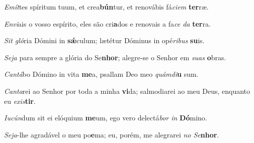 \begin{greenumerate}
  \setcounter{enumi}{1}


  \item \textit{Emít}tes spíritum tuum, et crea\textbf{bún}tur, {\GreStar} et renovábis fá\textit{ciem} \textbf{ter}ræ. 

  \switchcolumn\setcounter{enumi}{1}

  \item \textit{Envi}ais o vosso espírito, eles são cri\textbf{a}dos {\GreStar} e renovais a fa\textit{ce da} \textbf{ter}ra. 

  \switchcolumn*


  \item \textit{Sit gló}ria Dómini in \textbf{sǽ}culum; {\GreStar} lætétur Dóminus in opé\textit{ribus} \textbf{su}is. 

  \switchcolumn%

  \item \textit{Seja} para sempre a glória do Se\textbf{nhor}; {\GreStar} alegre-se o Senhor em \textit{suas} \textbf{o}bras. 

  \switchcolumn*


  \item \textit{Cantá}bo Dómino in vita \textbf{me}a, {\GreStar} psallam Deo meo \textit{quámdi}\textbf{u} sum. 

  \switchcolumn%

  \item \textit{Canta}rei ao Senhor por toda a minha \textbf{vi}da; {\GreStar} salmodiarei ao meu Deus, enquanto eu \textit{exis}\textbf{tir}. 

  \switchcolumn*


  \item \textit{Iucún}dum sit ei elóquium \textbf{me}um, {\GreStar} ego vero delectá\textit{bor in} \textbf{Dó}mino. 

  \switchcolumn%

  \item \textit{Seja}-lhe agradável o meu po\textbf{e}ma; {\GreStar} eu, porém, me alegrarei \textit{no Se}\textbf{nhor}. 


\end{greenumerate}

